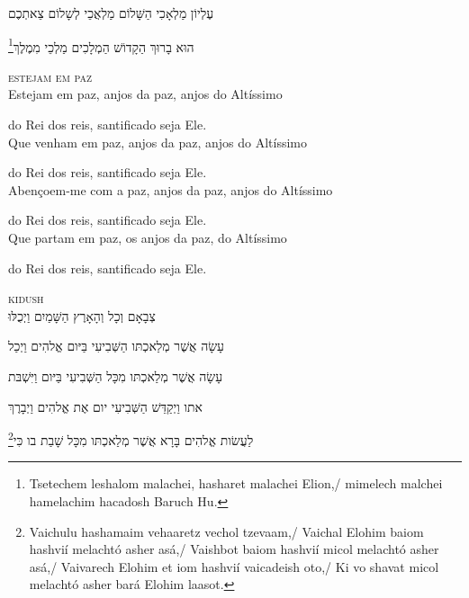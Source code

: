 עֶלְיוֹן מַלְאָכִי הַשָּׁלוֹם מַלְאֲכֵי לְשָלוֹם צֵאתְכֶם 

\footnote{Tsetechem leshalom malachei, hasharet malachei Elion,/
mimelech malchei hamelachim hacadosh Baruch Hu.}הוּא בָרוּךְ הַקָדוֹשׁ הַמְלָכִים מַלְכֵי מִמֶלֶךְ


\movetooddpage
\raggedright

\vspace*{1cm}

\textsc{estejam em paz}\\[15pt]


Estejam em paz, anjos da paz, anjos do Altíssimo

do Rei dos reis, santificado seja Ele.\\[10pt]

Que venham em paz, anjos da paz, anjos do Altíssimo

do Rei dos reis, santificado seja Ele.\\[10pt]

Abençoem-me com a paz, anjos da paz, \qb{}anjos do Altíssimo

do Rei dos reis, santificado seja Ele.\\[10pt]

Que partam em paz, os anjos da paz, \qb{}do Altíssimo

do Rei dos reis, santificado seja Ele.\\[10pt]


\movetoevenpage
\raggedleft


\vspace*{1cm}

\textsc{kidush}\\[15pt]

צְבָאָם וְכָל וְהָאָרֶץ הַשָּׁמַיִם וַיְכֻלּוּ 

עָשָׂה אֲשֶׁר מְלַאכְתּו הַשְּׁבִיעִי בַּיּום אֱלהִים וַיְכַל 

עָשָׂה אֲשֶׁר מְלַאכְתּו מִכָּל הַשְּׁבִיעִי בַּיּום וַיִּשְׁבּת 

אתו וַיְקַדֵּשׁ הַשְּׁבִיעִי יום אֶת אֱלהִים וַיְבָרֶךְ 

\footnote{Vaichulu hashamaim vehaaretz vechol tzevaam,/
Vaichal Elohim baiom hashvií melachtó asher asá,/
Vaishbot baiom hashvií micol melachtó asher asá,/
Vaivarech Elohim et iom hashvií vaicadeish oto,/
Ki vo shavat micol melachtó asher bará Elohim laasot.}לַעֲשׂות אֱלהִים בָּרָא אֲשֶׁר מְלַאכְתּו מִכָּל שָׁבַת בו כִּי\\[10pt] 

